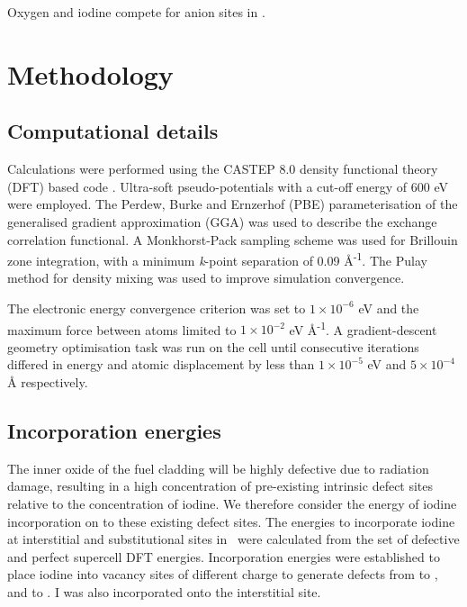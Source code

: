 Oxygen and iodine compete for anion sites in \zirconia .

\section{Methodology}
\subsection{Computational details}

Calculations were performed using the CASTEP 8.0 density functional theory (DFT) based code \cite{Clark2005}. Ultra-soft pseudo-potentials with a cut-off energy of 600 eV were employed. The Perdew, Burke and Ernzerhof (PBE) \cite{Perdew1996} parameterisation of the generalised gradient approximation (GGA) was used to describe the exchange correlation functional. A Monkhorst-Pack sampling scheme \cite{Monkhorst1976} was used for Brillouin zone integration, with a minimum \emph{k}-point separation of 0.09 \r{A}\textsuperscript{-1}. The Pulay method for density mixing \cite{Pulay1980} was used to improve simulation convergence. 

The electronic energy convergence criterion was set to $1\times10^{-6}$ eV and the maximum force between atoms limited to $1\times10^{-2}$ eV \r{A}\textsuperscript{-1}. A gradient-descent geometry optimisation task was run on the cell until consecutive iterations differed in energy and atomic displacement by less than $1\times10^{-5}$ eV and $5\times10^{-4}$ \r{A} respectively. \\

\subsection{Incorporation energies}

The inner oxide of the fuel cladding will be highly defective due to radiation damage, resulting in a high concentration of pre-existing intrinsic defect sites relative to the concentration of iodine. We therefore consider the energy of iodine incorporation on to these existing defect sites. The energies to incorporate iodine at interstitial and substitutional sites in \zirconia\ were calculated from the set of defective and perfect supercell DFT energies. Incorporation energies were established to place iodine into vacancy sites of different charge to generate defects from  to , and  to . I was also incorporated onto the interstitial site. 


